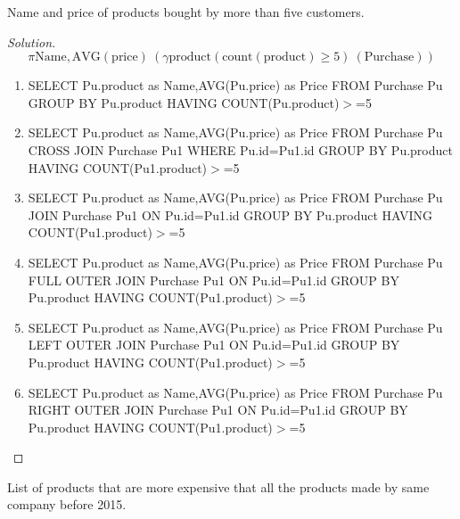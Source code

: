 \documentclass[10pt,a4paper]{article}
\newenvironment{problem}[2][Problem]{\begin{trivlist}
\item[\hskip \labelsep {\bfseries #1}\hskip \labelsep {\bfseries #2.}]}{\end{trivlist}}
\begin{document}
\begin{problem}{7}
Name and price of products bought by more than five customers.
\end{problem}
\begin{proof}[Solution]
\begin{equation}
\pi \text{Name}, \text{AVG} (\text{price}) \ (\gamma \text{product} (\text{count} (\text{product}) \geq 5) \ (\text{Purchase}))
\end{equation}

\begin{enumerate}
	\item SELECT Pu.product as Name,AVG(Pu.price) as Price FROM Purchase Pu GROUP BY Pu.product HAVING COUNT(Pu.product)$>$=5
	\item SELECT Pu.product as Name,AVG(Pu.price) as Price FROM Purchase Pu CROSS JOIN Purchase Pu1 WHERE Pu.id=Pu1.id GROUP BY Pu.product HAVING COUNT(Pu1.product)$>$=5
	\item  SELECT Pu.product as Name,AVG(Pu.price) as Price FROM Purchase Pu JOIN Purchase Pu1 ON Pu.id=Pu1.id GROUP BY Pu.product HAVING COUNT(Pu1.product)$>$=5
	\item SELECT Pu.product as Name,AVG(Pu.price) as Price FROM Purchase Pu FULL OUTER JOIN Purchase Pu1 ON Pu.id=Pu1.id GROUP BY Pu.product HAVING COUNT(Pu1.product)$>$=5
	\item SELECT Pu.product as Name,AVG(Pu.price) as Price FROM Purchase Pu LEFT OUTER JOIN Purchase Pu1 ON Pu.id=Pu1.id GROUP BY Pu.product HAVING COUNT(Pu1.product)$>$=5
	\item SELECT Pu.product as Name,AVG(Pu.price) as Price FROM Purchase Pu RIGHT OUTER JOIN Purchase Pu1 ON Pu.id=Pu1.id GROUP BY Pu.product HAVING COUNT(Pu1.product)$>$=5
\end{enumerate}
\end{proof}

\begin{problem}{8}
List of products that are more expensive that all the products made by same company before 2015.
\end{problem}
\end{document}
